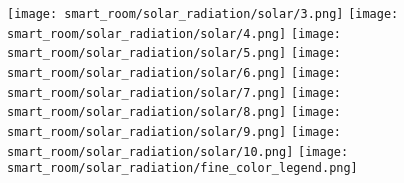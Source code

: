 \begin{figure}[H]
\texttt{[image: smart\_room/solar\_radiation/solar/3.png]}\hfill
\texttt{[image: smart\_room/solar\_radiation/solar/4.png]}\hfill
\texttt{[image: smart\_room/solar\_radiation/solar/5.png]}\hfill
\texttt{[image: smart\_room/solar\_radiation/solar/6.png]}\hfill
\texttt{[image: smart\_room/solar\_radiation/solar/7.png]}\hfill
\texttt{[image: smart\_room/solar\_radiation/solar/8.png]}\hfill
\texttt{[image: smart\_room/solar\_radiation/solar/9.png]}\hfill
\texttt{[image: smart\_room/solar\_radiation/solar/10.png]}\hfill
\texttt{[image: smart\_room/solar\_radiation/fine\_color\_legend.png]}\hfill
\caption{}
\label{fine-radiation}
\end{figure}











































